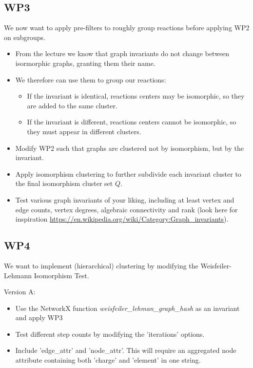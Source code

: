 \documentclass[a4,12pt]{article}
\theoremstyle{plain}
\numberwithin{theorem}{section}
\begin{document}
\subsection{WP3}

We now want to apply pre-filters to roughly group reactions before applying WP2 on subgroups.
\begin{itemize}
\item From the lecture we know that graph invariants do not change between isormorphic graphs, granting them their name.
\item We therefore can use them to group our reactions:
\begin{itemize}
\item If the invariant is identical, reactions centers may be isomorphic, so they are added to the same cluster.
\item If the invariant is different, reactions centers cannot be isomorphic, so they must appear in different clusters.
\end{itemize}
\item Modify WP2 such that graphs are clustered not by isomorphism, but by the invariant.
\item Apply isomorphism clustering to further subdivide each invariant cluster to the final isomorphism cluster set $Q$.
\item Test various graph invariants of your liking, including at least vertex and edge counts, vertex degrees, algebraic connectivity and rank (look here for inspiration \url{https://en.wikipedia.org/wiki/Category:Graph_invariants}).
\end{itemize}

\subsection{WP4}

We want to implement (hierarchical) clustering by modifying the Weisfeiler-Lehmann Isomorphism Test. 

Version A:
\begin{itemize}
\item Use the NetworkX function \textit{weisfeiler\_lehman\_graph\_hash} as an invariant and apply WP3
\item Test different step counts by modifying the 'iterations' options.
\item Include 'edge\_attr' and 'node\_attr'. This will require an aggregated node attribute containing both 'charge' and 'element' in one string.
\end{itemize}
\end{document}
